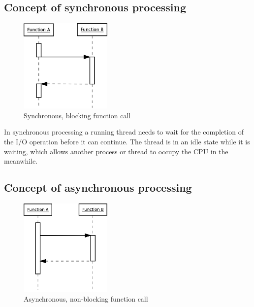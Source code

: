 \subsection{Concept of synchronous processing}
\label{concept_sync}
\FloatBarrier

\begin{figure}[hbtp]
\centering
\includegraphics[width=0.4\textwidth]{img/synch_call.png}
\caption{Synchronous, blocking function call}
\label{fig:synch_call}
\end{figure}

In synchronous processing a running thread needs to wait for the completion of
the I/O operation before it can continue.
The thread is in an idle state while it is waiting, which allows another process 
or thread to occupy the CPU in the meanwhile.
\FloatBarrier
\subsection{Concept of asynchronous processing}
\label{concept_async}
\FloatBarrier

\begin{figure}[hbtp]
\centering
\includegraphics[width=0.4\textwidth]{img/asynch_call.png}
\caption{Asynchronous, non-blocking function call}
\label{fig:asynch_call}
\end{figure}

